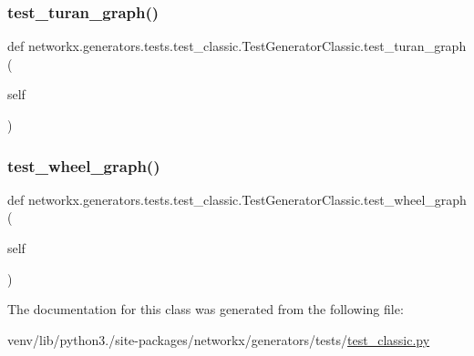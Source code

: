 \subsubsection{\texorpdfstring{test\+\_\+turan\+\_\+graph()}{test\_turan\_graph()}}
{\footnotesize\ttfamily def networkx.\+generators.\+tests.\+test\+\_\+classic.\+Test\+Generator\+Classic.\+test\+\_\+turan\+\_\+graph (\begin{DoxyParamCaption}\item[{}]{self }\end{DoxyParamCaption})}

\mbox{\label{classnetworkx_1_1generators_1_1tests_1_1test__classic_1_1TestGeneratorClassic_a1695d2b1d14103ec60439bb03e2ed0ac}} 
\subsubsection{\texorpdfstring{test\+\_\+wheel\+\_\+graph()}{test\_wheel\_graph()}}
{\footnotesize\ttfamily def networkx.\+generators.\+tests.\+test\+\_\+classic.\+Test\+Generator\+Classic.\+test\+\_\+wheel\+\_\+graph (\begin{DoxyParamCaption}\item[{}]{self }\end{DoxyParamCaption})}



The documentation for this class was generated from the following file\+:\begin{DoxyCompactItemize}
\item 
venv/lib/python3./site-\/packages/networkx/generators/tests/\hyperlink{test__classic_8py}{test\+\_\+classic.\+py}\end{DoxyCompactItemize}
